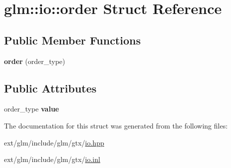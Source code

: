 \hypertarget{structglm_1_1io_1_1order}{\section{glm\-:\-:io\-:\-:order Struct Reference}
\label{structglm_1_1io_1_1order}
}
\subsection*{Public Member Functions}
\begin{DoxyCompactItemize}
\item 
\hypertarget{structglm_1_1io_1_1order_a06813d404c975865fdd3a77146268a1f}{{\bfseries order} (order\-\_\-type)}\label{structglm_1_1io_1_1order_a06813d404c975865fdd3a77146268a1f}

\end{DoxyCompactItemize}
\subsection*{Public Attributes}
\begin{DoxyCompactItemize}
\item 
\hypertarget{structglm_1_1io_1_1order_aa8788dd0568bacd081d02bd5aca9889b}{order\-\_\-type {\bfseries value}}\label{structglm_1_1io_1_1order_aa8788dd0568bacd081d02bd5aca9889b}

\end{DoxyCompactItemize}


The documentation for this struct was generated from the following files\-:\begin{DoxyCompactItemize}
\item 
ext/glm/include/glm/gtx/\hyperlink{io_8hpp}{io.\-hpp}\item 
ext/glm/include/glm/gtx/\hyperlink{io_8inl}{io.\-inl}\end{DoxyCompactItemize}
